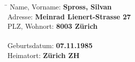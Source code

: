 \begin{tabbing}
	\hspace*{4cm}   \= \kill
	Name, Vorname:  \> {\bf Spross, Silvan} \\
	Adresse:        \> {\bf Meinrad Lienert-Strasse 27} \\
	PLZ, Wohnort:   \> {\bf 8003 Zürich} \\
	\\
	Geburtsdatum:   \> {\bf 07.11.1985} \\
	Heimatort:      \> {\bf Zürich ZH} \\
\end{tabbing}